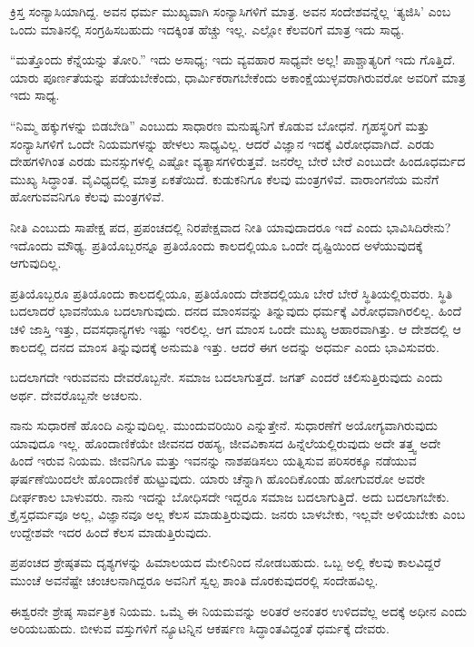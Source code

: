ಕ್ರಿಸ್ತ ಸಂನ್ಯಾಸಿಯಾಗಿದ್ದ. ಅವನ ಧರ್ಮ ಮುಖ್ಯವಾಗಿ ಸಂನ್ಯಾಸಿಗಳಿಗೆ ಮಾತ್ರ. ಅವನ ಸಂದೇಶವನ್ನೆಲ್ಲ ‘ತ್ಯಜಿಸಿ’ ಎಂಬ ಒಂದು ಮಾತಿನಲ್ಲಿ ಸಂಗ್ರಹಿಸಬಹುದು ಇದಕ್ಕಿಂತ ಹೆಚ್ಚು ಇಲ್ಲ. ಎಲ್ಲೋ ಕೆಲವರಿಗೆ ಮಾತ್ರ ಇದು ಸಾಧ್ಯ.

“ಮತ್ತೊಂದು ಕೆನ್ನೆಯನ್ನು ತೋರಿ.” ಇದು ಅಸಾಧ್ಯ; ಇದು ವ್ಯವಹಾರ ಸಾಧ್ಯವೇ ಅಲ್ಲ! ಪಾಶ್ಚಾತ್ಯರಿಗೆ ಇದು ಗೊತ್ತಿದೆ. ಯಾರು ಪೂರ್ಣತೆಯನ್ನು ಪಡೆಯಬೇಕೆಂದು, ಧಾರ್ಮಿಕರಾಗಬೇಕೆಂದು ಅಕಾಂಕ್ಷೆಯುಳ್ಳವರಾಗಿರುವರೋ ಅವರಿಗೆ ಮಾತ್ರ ಇದು ಸಾಧ್ಯ.

“ನಿಮ್ಮ ಹಕ್ಕುಗಳನ್ನು ಬಿಡಬೇಡಿ” ಎಂಬುದು ಸಾಧಾರಣ ಮನುಷ್ಯನಿಗೆ ಕೊಡುವ ಬೋಧನೆ. ಗೃಹಸ್ಥರಿಗೆ ಮತ್ತು ಸಂನ್ಯಾಸಿಗಳಿಗೆ ಒಂದೇ ನಿಯಮಗಳನ್ನು ಹೇಳಲು ಸಾಧ್ಯವಿಲ್ಲ. ಆದರೆ ವಿಜ್ಞಾನ ಇದಕ್ಕೆ ವಿರೋಧವಾಗಿದೆ. ಎರಡು ದೇಹಗಳಿಗಿಂತ ಎರಡು ಮನಸ್ಸುಗಳಲ್ಲಿ ಎಷ್ಟೋ ವ್ಯತ್ಯಾಸಗಳಿರುತ್ತವೆ. ಜನರೆಲ್ಲ ಬೇರೆ ಬೇರೆ ಎಂಬುದೇ ಹಿಂದೂಧರ್ಮದ ಮುಖ್ಯ ಸಿದ್ಧಾಂತ. ವೈವಿಧ್ಯದಲ್ಲಿ ಮಾತ್ರ ಏಕತೆಯಿದೆ. ಕುಡುಕನಿಗೂ ಕೆಲವು ಮಂತ್ರಗಳಿವೆ. ವಾರಾಂಗನೆಯ ಮನೆಗೆ ಹೋಗುವವನಿಗೂ ಕೆಲವು ಮಂತ್ರಗಳಿವೆ.

ನೀತಿ ಎಂಬುದು ಸಾಪೇಕ್ಷ ಪದ, ಪ್ರಪಂಚದಲ್ಲಿ ನಿರಪೇಕ್ಷವಾದ ನೀತಿ ಯಾವುದಾದರೂ ಇದೆ ಎಂದು ಭಾವಿಸಿದಿರೇನು? ಇದೊಂದು ಮೌಢ್ಯ. ಪ್ರತಿಯೊಬ್ಬರನ್ನೂ ಪ್ರತಿಯೊಂದು ಕಾಲದಲ್ಲಿಯೂ ಒಂದೇ ದೃಷ್ಟಿಯಿಂದ ಅಳೆಯುವುದಕ್ಕೆ ಆಗುವುದಿಲ್ಲ.

ಪ್ರತಿಯೊಬ್ಬರೂ ಪ್ರತಿಯೊಂದು ಕಾಲದಲ್ಲಿಯೂ, ಪ್ರತಿಯೊಂದು ದೇಶದಲ್ಲಿಯೂ ಬೇರೆ ಬೇರೆ ಸ್ಥಿತಿಯಲ್ಲಿರುವರು. ಸ್ಥಿತಿ ಬದಲಾದರೆ ಭಾವನೆಯೂ ಬದಲಾಗುವುದು. ದನದ ಮಾಂಸವನ್ನು ತಿನ್ನುವುದು ಧರ್ಮಕ್ಕೆ ವಿರೋಧವಾಗಿರಲಿಲ್ಲ. ಹಿಂದೆ ಚಳಿ ಜಾಸ್ತಿ ಇತ್ತು, ದವಸಧಾನ್ಯಗಳು ಇಷ್ಟು ಇರಲಿಲ್ಲ. ಆಗ ಮಾಂಸ ಒಂದೇ ಮುಖ್ಯ ಆಹಾರವಾಗಿತ್ತು. ಆ ದೇಶದಲ್ಲಿ ಆ ಕಾಲದಲ್ಲಿ ದನದ ಮಾಂಸ ತಿನ್ನುವುದಕ್ಕೆ ಅನುಮತಿ ಇತ್ತು. ಆದರೆ ಈಗ ಅದನ್ನು ಅಧರ್ಮ ಎಂದು ಭಾವಿಸುವರು.

ಬದಲಾಗದೇ ಇರುವವನು ದೇವರೊಬ್ಬನೇ. ಸಮಾಜ ಬದಲಾಗುತ್ತದೆ. ಜಗತ್ ಎಂದರೆ ಚಲಿಸುತ್ತಿರುವುದು ಎಂದು ಅರ್ಥ. ದೇವರೊಬ್ಬನೇ ಅಚಲನು.

ನಾನು ಸುಧಾರಣೆ ಹೊಂದಿ ಎನ್ನುವುದಿಲ್ಲ. ಮುಂದುವರಿಯಿರಿ ಎನ್ನುತ್ತೇನೆ. ಸುಧಾರಣೆಗೆ ಅಯೋಗ್ಯವಾಗಿರುವುದು ಯಾವುದೂ ಇಲ್ಲ. ಹೊಂದಾಣಿಕೆಯೇ ಜೀವನದ ರಹಸ್ಯ, ಜೀವವಿಕಾಸದ ಹಿನ್ನೆಲೆಯಲ್ಲಿರುವುದು ಅದೇ ತತ್ತ್ವ ಅದೇ ಹಿಂದೆ ಇರುವ ನಿಯಮ. ಜೀವನಿಗೂ ಮತ್ತು ಇವನನ್ನು ನಾಶಪಡಿಸಲು ಯತ್ನಿಸುವ ಪರಿಸರಕ್ಕೂ ನಡೆಯುವ ಘರ್ಷಣೆಯಿಂದಲೇ ಹೊಂದಾಣಿಕೆ ಹುಟ್ಟುವುದು. ಯಾರು ಚೆನ್ನಾಗಿ ಹೊಂದಿಕೊಂಡು ಹೋಗುವರೋ ಅವರೇ ದೀರ್ಘಕಾಲ ಬಾಳುವರು. ನಾನು ಇದನ್ನು ಬೋಧಿಸದೇ ಇದ್ದರೂ ಸಮಾಜ ಬದಲಾಗುತ್ತಿದೆ. ಅದು ಬದಲಾಗಬೇಕು. ಕ್ರೈಸ್ತಧರ್ಮವೂ ಅಲ್ಲ, ವಿಜ್ಞಾನವೂ ಅಲ್ಲ ಕೆಲಸ ಮಾಡುತ್ತಿರುವುದು. ಜನರು ಬಾಳಬೇಕು, ಇಲ್ಲವೇ ಅಳಿಯಬೇಕು ಎಂಬ ಉದ್ದೇಶವೇ ಇದರ ಹಿಂದೆ ಕೆಲಸ ಮಾಡುತ್ತಿರುವುದು.

ಪ್ರಪಂಚದ ಶ್ರೇಷ್ಠತಮ ದೃಶ್ಯಗಳನ್ನು ಹಿಮಾಲಯದ ಮೇಲಿನಿಂದ ನೋಡಬಹುದು. ಒಬ್ಬ ಅಲ್ಲಿ ಕೆಲವು ಕಾಲವಿದ್ದರೆ ಮುಂಚೆ ಅವನೆಷ್ಟೇ ಚಂಚಲನಾಗಿದ್ದರೂ ಅವನಿಗೆ ಸ್ವಲ್ಪ ಶಾಂತಿ ದೊರಕುವುದರಲ್ಲಿ ಸಂದೇಹವಿಲ್ಲ.

ಈಶ್ವರನೇ ಶ್ರೇಷ್ಠ ಸಾರ್ವತ್ರಿಕ ನಿಯಮ. ಒಮ್ಮೆ ಈ ನಿಯಮವನ್ನು ಅರಿತರೆ ಅನಂತರ ಉಳಿದವೆಲ್ಲ ಅದಕ್ಕೆ ಅಧೀನ ಎಂದು ಅರಿಯಬಹುದು. ಬೀಳುವ ವಸ್ತುಗಳಿಗೆ ನ್ಯೂಟನ್ನಿನ ಆಕರ್ಷಣ ಸಿದ್ಧಾಂತವಿದ್ದಂತೆ ಧರ್ಮಕ್ಕೆ ದೇವರು.

